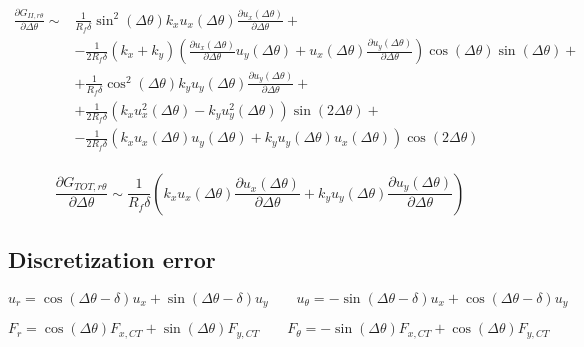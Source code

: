 \documentclass[a4paper]{jpconf}
\begin{document}
\begin{equation}
\begin{split}
\frac{\partial G_{II,r\theta}}{\partial\Delta\theta} \sim&\frac{1}{R_{f}\delta}\sin^{2}\left(\Delta\theta\right) k_{x}u_{x}\left(\Delta\theta\right)\frac{\partial u_{x}\left(\Delta\theta\right)}{\partial\Delta\theta}+\\
&-\frac{1}{2R_{f}\delta}\left(k_{x}+k_{y}\right)\left(\frac{\partial u_{x}\left(\Delta\theta\right)}{\partial\Delta\theta}u_{y}\left(\Delta\theta\right)+u_{x}\left(\Delta\theta\right)\frac{\partial u_{y}\left(\Delta\theta\right)}{\partial\Delta\theta}\right)\cos\left(\Delta\theta\right)\sin\left(\Delta\theta\right)+\\
&+\frac{1}{R_{f}\delta}\cos^{2}\left(\Delta\theta\right)k_{y}u_{y}\left(\Delta\theta\right)\frac{\partial u_{y}\left(\Delta\theta\right)}{\partial\Delta\theta}+\\
&+\frac{1}{2R_{f}\delta}\left(k_{x}u^{2}_{x}\left(\Delta\theta\right)- k_{y}u^{2}_{y}\left(\Delta\theta\right)\right)\sin\left(2\Delta\theta\right)+\\
&-\frac{1}{2R_{f}\delta}\left(k_{x}u_{x}\left(\Delta\theta\right)u_{y}\left(\Delta\theta\right)+k_{y}u_{y}\left(\Delta\theta\right)u_{x}\left(\Delta\theta\right)\right)\cos\left(2\Delta\theta\right)\\
\end{split}
\end{equation}

\begin{equation}
\frac{\partial G_{TOT,r\theta}}{\partial\Delta\theta} \sim\frac{1}{R_{f}\delta}\left( k_{x}u_{x}\left(\Delta\theta\right)\frac{\partial u_{x}\left(\Delta\theta\right)}{\partial\Delta\theta}+ k_{y}u_{y}\left(\Delta\theta\right)\frac{\partial u_{y}\left(\Delta\theta\right)}{\partial\Delta\theta}\right)
\end{equation}

\subsection{Discretization error}

\begin{equation}
u_{r}=\cos\left(\Delta\theta-\delta\right) u_{x}+\sin\left(\Delta\theta-\delta\right) u_{y}\qquad u_{\theta}=-\sin\left(\Delta\theta-\delta\right) u_{x}+\cos\left(\Delta\theta-\delta\right) u_{y}
\end{equation}

\begin{equation}
F_{r}=\cos\left(\Delta\theta\right) F_{x,CT}+\sin\left(\Delta\theta\right) F_{y,CT}\qquad F_{\theta}=-\sin\left(\Delta\theta\right) F_{x,CT}+\cos\left(\Delta\theta\right) F_{y,CT}
\end{equation}
\end{document}
